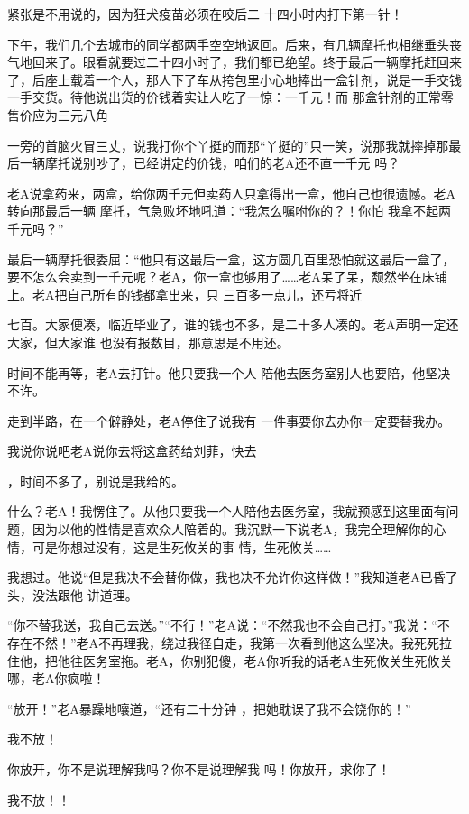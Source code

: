 \documentclass{article}
\begin{document}
紧张是不用说的，因为狂犬疫苗必须在咬后二
十四小时内打下第一针！ 

下午，我们几个去城市的同学都两手空空地返回。后来，有几辆摩托也相继垂头丧气地回来了。眼看就要过二十四小时了，我们都已绝望。终于最后一辆摩托赶回来了，后座上载着一个人，那人下了车从挎包里小心地捧出一盒针剂，说是一手交钱一手交货。待他说出货的价钱着实让人吃了一惊：一千元！而
那盒针剂的正常零售价应为三元八角 

一旁的首脑火冒三丈，说我打你个丫挺的而那“丫挺的”只一笑，说那我就摔掉那最后一辆摩托说别吵了，已经讲定的价钱，咱们的老A还不直一千元
吗？ 

老A说拿药来，两盒，给你两千元但卖药人只拿得出一盒，他自己也很遗憾。老A转向那最后一辆
\newpage
摩托，气急败坏地吼道：“我怎么嘱咐你的？！你怕
我拿不起两千元吗？” 

最后一辆摩托很委屈：“他只有这最后一盒，这方圆几百里恐怕就这最后一盒了，要不怎么会卖到一千元呢？老A，你一盒也够用了……老A呆了呆，颓然坐在床铺上。老A把自己所有的钱都拿出来，只
三百多一点儿，还亏将近 

七百。大家便凑，临近毕业了，谁的钱也不多，是二十多人凑的。老A声明一定还大家，但大家谁
也没有报数目，那意思是不用还。 

时间不能再等，老A去打针。他只要我一个人
陪他去医务室别人也要陪，他坚决不许。 

走到半路，在一个僻静处，老A停住了说我有
一件事要你去办你一定要替我办。 

我说你说吧老A说你去将这盒药给刘菲，快去

\newpage
，时间不多了，别说是我给的。 

什么？老A！我愣住了。从他只要我一个人陪他去医务室，我就预感到这里面有问题，因为以他的性情是喜欢众人陪着的。我沉默一下说老A，我完全理解你的心情，可是你想过没有，这是生死攸关的事
情，生死攸关…… 

我想过。他说“但是我决不会替你做，我也决不允许你这样做！”我知道老A已昏了头，没法跟他
讲道理。 

“你不替我送，我自己去送。”“不行！”老A说：“不然我也不会自己打。”我说：“不存在不然！”老A不再理我，绕过我径自走，我第一次看到他这么坚决。我死死拉住他，把他往医务室拖。老A，你别犯傻，老A你听我的话老A生死攸关生死攸关
哪，老A你疯啦！ 

“放开！”老A暴躁地嚷道，“还有二十分钟
，把她耽误了我不会饶你的！” 

\newpage


我不放！ 

你放开，你不是说理解我吗？你不是说理解我
吗！你放开，求你了！ 


我不放！！ 
\end{document}
